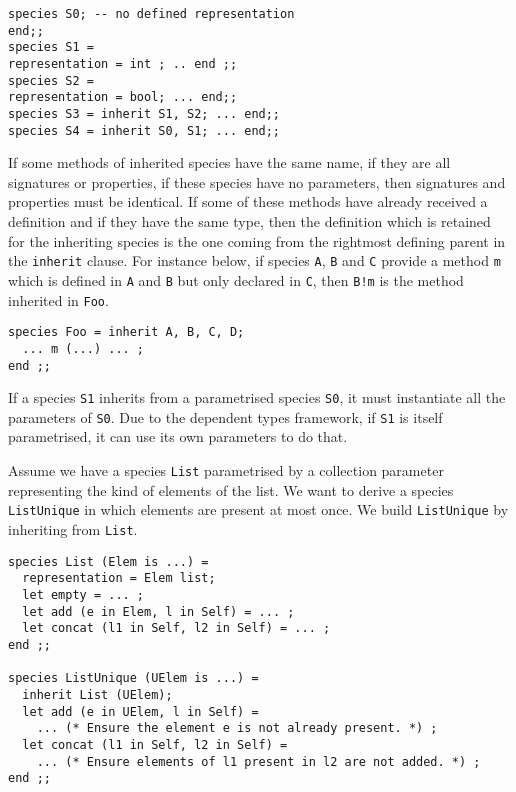 {\scriptsize
\begin{lstlisting}
species S0; -- no defined representation
end;;
species S1 =
representation = int ; .. end ;;
species S2 =
representation = bool; ... end;;
species S3 = inherit S1, S2; ... end;;
species S4 = inherit S0, S1; ... end;;
\end{lstlisting}}

If some methods of inherited species have the same name, if they are all
signatures or properties, if these species have no parameters, then
signatures and properties must be identical. If some of these methods have
already received a definition and if they have the same type, then the
definition which is retained for the inheriting species is the one coming
from the rightmost defining parent in the {\tt inherit} clause. For instance
below, if species {\tt A}, {\tt B} and {\tt C} provide a method {\tt m} which
is defined in {\tt A} and {\tt B} but only declared in {\tt C}, then
{\tt B!m} is the method inherited in {\tt Foo}.

{\scriptsize
\begin{lstlisting}
species Foo = inherit A, B, C, D;
  ... m (...) ... ;
end ;;
\end{lstlisting}}

\smallskip
{}
If a species {\tt S1} inherits from a parametrised species {\tt S0},
it must instantiate all the parameters of {\tt S0}. Due to the
dependent types framework, if {\tt S1} is itself
parametrised, it can use its own parameters to do that.

Assume we have a species {\tt List} parametrised by a collection parameter
representing the kind of elements of the list. We want to derive
a species {\tt ListUnique} in which elements are present at most
once. We build {\tt ListUnique} by inheriting from {\tt List}.

{\scriptsize
\begin{lstlisting}
species List (Elem is ...) =
  representation = Elem list;
  let empty = ... ;
  let add (e in Elem, l in Self) = ... ;
  let concat (l1 in Self, l2 in Self) = ... ;
end ;;

species ListUnique (UElem is ...) =
  inherit List (UElem);
  let add (e in UElem, l in Self) =
    ... (* Ensure the element e is not already present. *) ;
  let concat (l1 in Self, l2 in Self) =
    ... (* Ensure elements of l1 present in l2 are not added. *) ;
end ;;
\end{lstlisting}}

